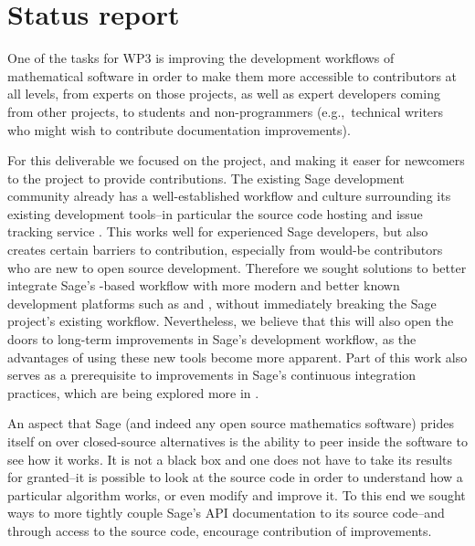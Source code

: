 \hypertarget{status-report}{%
\section{Status report}\label{status-report}}

One of the tasks for WP3 is improving the development workflows of mathematical
software in order to make them more accessible to contributors at all levels,
from experts on those projects, as well as expert developers coming from other
projects, to students and non-programmers (e.g.,~technical writers who might
wish to contribute documentation improvements).

For this deliverable we focused on the \Sage project, and making it easer for
newcomers to the project to provide contributions.  The existing Sage
development community already has a well-established workflow and culture
surrounding its existing development tools--in particular the source code
hosting and issue tracking service \Trac.  This works well for experienced
Sage developers, but also creates certain barriers to contribution, especially
from would-be contributors who are new to open source development.  Therefore
we sought solutions to better integrate Sage's \Trac-based workflow with more
modern and better known development platforms such as \GitHub and \GitLab,
without immediately breaking the Sage project's existing workflow.
Nevertheless, we believe that this will also open the doors to long-term
improvements in Sage's development workflow, as the advantages of using these
new tools become more apparent.  Part of this work also serves as a
prerequisite to improvements in Sage's continuous integration practices, which
are being explored more in
.

An aspect that Sage (and indeed any open source mathematics software) prides
itself on over closed-source alternatives is the ability to peer inside the
software to see how it works.  It is not a black box and one does not have to
take its results for granted--it is possible to look at the source code in
order to understand how a particular algorithm works, or even modify and
improve it.  To this end we sought ways to more tightly couple Sage's API
documentation to its source code--and through access to the source code,
encourage contribution of improvements.

